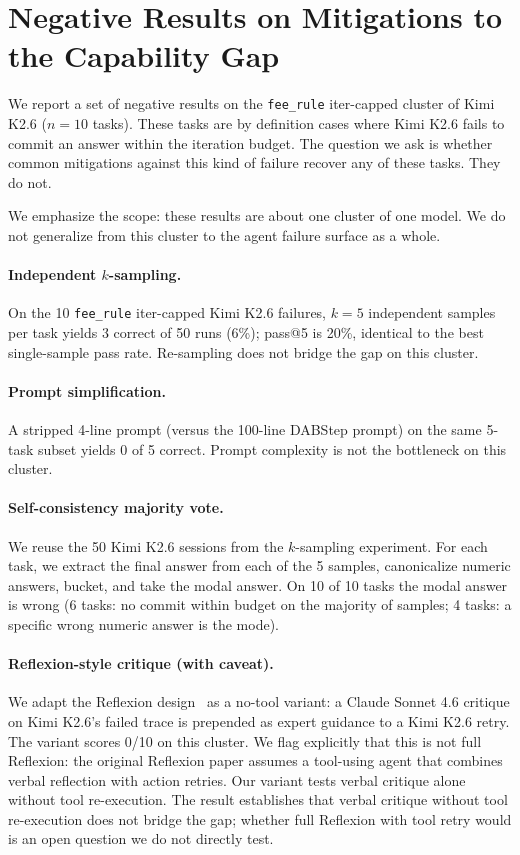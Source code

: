 \documentclass[conference]{IEEEtran}
\newcommand{\Kimi}{Kimi K2.6}
\newcommand{\Sonnet}{Claude Sonnet 4.6}
\begin{document}
\section{Negative Results on Mitigations to the Capability Gap}
\label{sec:negative}

We report a set of negative results on the \texttt{fee\_rule} iter-capped cluster of \Kimi{} ($n=10$ tasks). These tasks are by definition cases where \Kimi{} fails to commit an answer within the iteration budget. The question we ask is whether common mitigations against this kind of failure recover any of these tasks. They do not.

We emphasize the scope: these results are about one cluster of one model. We do not generalize from this cluster to the agent failure surface as a whole.

\paragraph{Independent $k$-sampling.}
On the 10 \texttt{fee\_rule} iter-capped \Kimi{} failures, $k=5$ independent samples per task yields 3 correct of 50 runs (6\%); pass@5 is 20\%, identical to the best single-sample pass rate. Re-sampling does not bridge the gap on this cluster.

\paragraph{Prompt simplification.}
A stripped 4-line prompt (versus the 100-line DABStep prompt) on the same 5-task subset yields 0 of 5 correct. Prompt complexity is not the bottleneck on this cluster.

\paragraph{Self-consistency majority vote.}
We reuse the 50 \Kimi{} sessions from the $k$-sampling experiment. For each task, we extract the final answer from each of the 5 samples, canonicalize numeric answers, bucket, and take the modal answer. On 10 of 10 tasks the modal answer is wrong (6 tasks: no commit within budget on the majority of samples; 4 tasks: a specific wrong numeric answer is the mode).

\paragraph{Reflexion-style critique (with caveat).}
We adapt the Reflexion design~\cite{reflexion2023} as a no-tool variant: a \Sonnet{} critique on \Kimi{}'s failed trace is prepended as expert guidance to a \Kimi{} retry. The variant scores 0/10 on this cluster. We flag explicitly that this is not full Reflexion: the original Reflexion paper assumes a tool-using agent that combines verbal reflection with action retries. Our variant tests verbal critique alone without tool re-execution. The result establishes that verbal critique without tool re-execution does not bridge the gap; whether full Reflexion with tool retry would is an open question we do not directly test.
\end{document}
